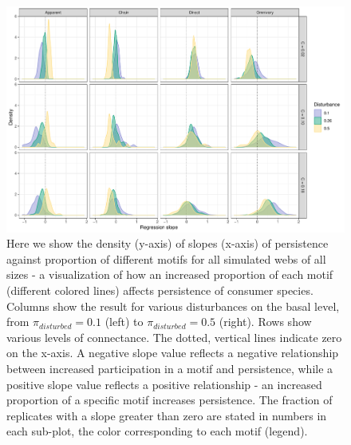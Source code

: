 \documentclass[12pt]{article}
\begin{document}
\begin{spacing}{2.0}
    \begin{figure}[hb!]
    \centering
        \includegraphics[width=\textwidth]{manuscript/figures/Fig4.pdf}
        \caption{Here we show the density (y-axis) of slopes (x-axis) of persistence against proportion of different motifs for all simulated webs of all sizes - a visualization of how an increased proportion of each motif (different colored lines) affects persistence of consumer species. Columns show the result for various disturbances on the basal level, from $\pi_{disturbed} = 0.1$ (left) to $\pi_{disturbed} = 0.5$ (right). Rows show various levels of connectance. The dotted, vertical lines indicate zero on the x-axis. A negative slope value reflects a negative relationship between increased participation in a motif and persistence, while a positive slope value reflects a positive relationship - an increased proportion of a specific motif increases persistence. The fraction of replicates with a slope greater than zero are stated in numbers in each sub-plot, the color corresponding to each motif (legend). }
        \label{fig:density_prop_C}
    \end{figure}    
    
    

\end{spacing}
\end{document}
